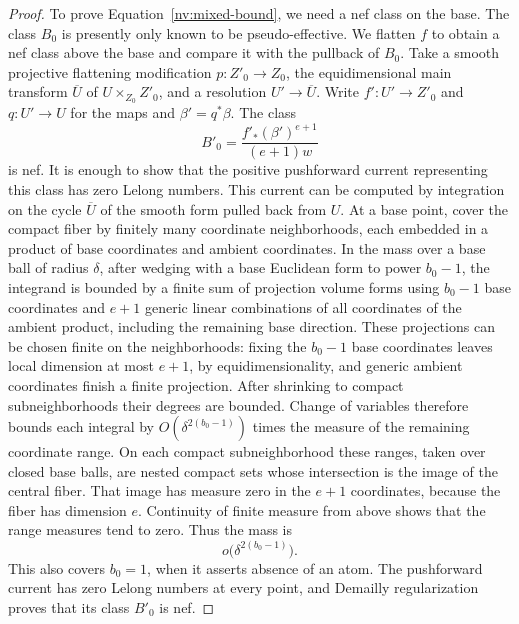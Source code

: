 \begin{proof}
To prove Equation~\eqref{nv:mixed-bound}, we need a nef class on the base.
The class \(B_0\) is presently only known to be pseudo-effective.  We
flatten \(f\) to obtain a nef class above the base and compare it
with the pullback of \(B_0\).  Take a smooth projective flattening
modification \(p:Z'_0\to Z_0\), the equidimensional main transform
\(\overline U\) of \(U\times_{Z_0}Z'_0\), and a resolution
\(U'\to\overline U\).  Write \(f':U'\to Z'_0\) and \(q:U'\to U\) for
the maps and \(\beta'=q^*\beta\).  The class
\[
 B'_0=\frac{f'_*(\beta')^{e+1}}{(e+1)w}
\]
is nef.  It is enough to show that the positive pushforward current
representing this class has zero Lelong numbers.  This current can
be computed by integration on the cycle \(\overline U\) of the smooth
form pulled back from \(U\).  At a base point, cover the compact fiber
by finitely many coordinate neighborhoods, each embedded in a product
of base coordinates and ambient coordinates.  In the mass over a base
ball of radius \(\delta\), after wedging with a base Euclidean form to
power \(b_0-1\), the integrand is bounded by a finite sum of projection
volume forms using \(b_0-1\) base coordinates and \(e+1\) generic
linear combinations of all coordinates of the ambient product, including
the remaining base direction.  These projections can be chosen finite on the
neighborhoods: fixing the \(b_0-1\) base coordinates leaves local
dimension at most \(e+1\), by equidimensionality, and generic ambient
coordinates finish a finite projection.  After shrinking to compact
subneighborhoods their degrees are bounded.  Change of variables
therefore bounds each integral by
\(O(\delta^{2(b_0-1)})\) times the measure of the remaining coordinate
range.  On each compact subneighborhood these ranges, taken over closed
base balls, are nested compact sets whose intersection is the image of
the central fiber.  That image has measure zero in the \(e+1\) coordinates,
because the fiber has dimension \(e\).  Continuity of finite measure from
above shows that the range measures tend to zero.  Thus the
mass is
\[
 o\bigl(\delta^{2(b_0-1)}\bigr).
\]
This also covers \(b_0=1\), when it asserts absence of an atom.  The
pushforward current has zero Lelong numbers at every point, and
Demailly regularization \cite[Theorem~1.1]{DemaillyRegularization1992}
proves that its class \(B'_0\) is nef.


\end{proof}
